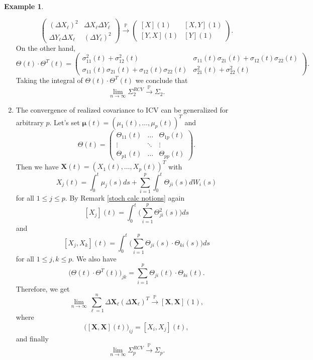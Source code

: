 \documentclass[a4paper,11pt]{article}
\theoremstyle{plain}
\theoremstyle{definition}
\newtheorem{exmp}[thm]{Example}
\begin{document}
\begin{exmp}
\begin{enumerate}
\[\begin{pmatrix}
			(\Delta X_\ell)^2 & \Delta X_\ell \Delta Y_\ell \\
			\Delta Y_\ell \Delta X_\ell & (\Delta Y_\ell)^2
			\end{pmatrix} 
			\xrightarrow{\mathbb{P}} 
			\begin{pmatrix}
			[X](1) & [X, Y](1) \\
			[Y, X](1) & [Y](1)
		    \end{pmatrix}.
			\]
			On the other hand,
			\[ \Theta(t) \cdot \Theta^T(t) = \begin{pmatrix}
			\sigma_{11}^2(t) + \sigma_{12}^2(t) & \sigma_{11}(t)\sigma_{21}(t) + \sigma_{12}(t)\sigma_{22}(t) \\
			\sigma_{11}(t)\sigma_{21}(t) + \sigma_{12}(t)\sigma_{22}(t)  & \sigma_{21}^2(t) + \sigma_{22}^2(t)
			\end{pmatrix}. \]
			Taking the integral of $\Theta(t) \cdot \Theta^T(t)$ we conclude that
			\[ \lim_{n \rightarrow \infty} \Sigma_2^{RCV} \xrightarrow{\mathbb{P}} \Sigma_2. \]
			\item 
			The convergence of realized covariance to ICV can be generalized for arbitrary $p$. Let's set $\boldsymbol{\mu}(t) = (\mu_1(t), \dots, \mu_p(t))^T$ and
			\[ 
			\Theta(t) = \begin{pmatrix}
			\Theta_{11}(t) & \dots & \Theta_{1p}(t) \\
			\vdots & \ddots & \vdots \\
			\Theta_{p1}(t) & \dots & \Theta_{pp}(t)
			\end{pmatrix}.
			\]
			Then we have $\mathbf{X}(t) = (X_1(t), \dots, X_p(t))^T$ with
			\[X_j(t) =  \int_0^t\mu_j(s) ds +  \sum_{i=1}^{p} \int_0^t \Theta_{ji}(s) dW_i(s) \]			
			for all $1 \leq j \leq p$. By Remark \ref{stoch calc notions} again
			\[ [X_j](t)= \int_0^t \bigg( \sum_{i=1}^{p} \Theta_{ji}^2(s) \bigg) ds \]
			and
			\[ [X_j, X_k](t) = \int_0^t \bigg(  \sum_{i=1}^{p} \Theta_{ji}(s) \cdot \Theta_{ki}(s) \bigg) ds \]
			for all $1 \leq j,k \leq p$.
			We also have
			\[ 
			\Big(\Theta(t) \cdot \Theta^T(t) \Big)_{jk}   = \sum_{i=1}^{p} \Theta_{ji}(t) \cdot \Theta_{ki}(t).
			\]
			Therefore, we get
			\[  \lim_{n \rightarrow \infty} \sum_{\ell=1}^{n}\Delta \mathbf{X}_\ell(\Delta \mathbf{X}_\ell)^T \xrightarrow{\mathbb{P}} [\mathbf{X}, \mathbf{X}](1), \]
			where 
			\[ \Big( [\mathbf{X}, \mathbf{X}](t)\Big)_{ij} = [X_i, X_j](t), \]
			and finally
			\[ \lim_{n \rightarrow \infty} \Sigma_p^{RCV} \xrightarrow{\mathbb{P}} \Sigma_p. \]
		\end{enumerate}
		

\end{exmp}
\end{document}
